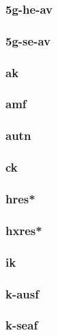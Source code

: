\subsubsection{\gls{5g-he-av}}

\subsubsection{\gls{5g-se-av}}

\subsubsection{\gls{ak}}

\subsubsection{\gls{amf}}

\subsubsection{\gls{autn}}

\subsubsection{\gls{ck}}

\subsubsection{\gls{hres*}}

\subsubsection{\gls{hxres*}}

\subsubsection{\gls{ik}}

\subsubsection{\gls{k-ausf}}

\subsubsection{\gls{k-seaf}}

